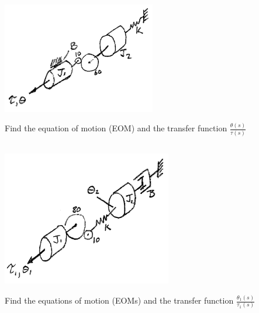 \documentclass{article}	%
\begin{document}


\subsection{}\label{2mass10to60}

\includegraphics[width=67mm]{00462a.png}

Find the equation of motion (EOM) and the transfer function $\frac{\theta(s)}{\tau(s)}$


%



\subsection{}
\includegraphics[width=74mm]{00463a.png}

Find the equations of motion (EOMs)  and the transfer function  $\frac{\theta_1(s)}{\tau_1(s)}$


%
\end{document}
